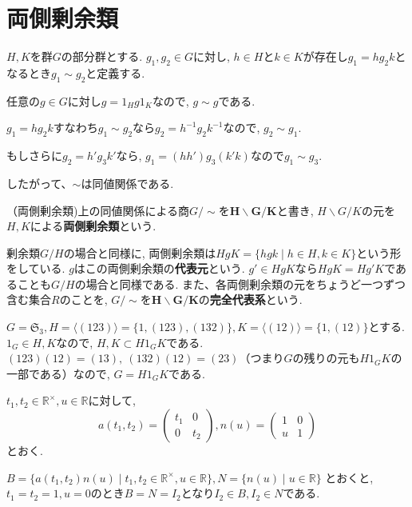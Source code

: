 \section*{両側剰余類}

$H,K$を群$G$の部分群とする. $g_1,g_2 \in G$に対し, 
$h \in H$と$k \in K$が存在し$g_1 = hg_2k$となるとき$g_1\sim g_2$と定義する.

任意の$g\in G$に対し$g=1_Hg1_K$なので, $g\sim g$である.

$g_1=hg_2k$すなわち$g_1\sim g_2$なら$g_2=h^{-1}g_2k^{-1}$なので, $g_2 \sim g_1$.

もしさらに$g_2=h'g_3k'$なら, $g_1 = (hh')g_3(k'k)$なので$g_1\sim g_3$.

したがって、$\sim$は同値関係である.

\begin{dfn*}
  （両側剰余類)\quad 上の同値関係による商$G/\sim$を$\mathbf{H\backslash G/K}$と書き,
  $H\backslash G/K$の元を$H,K$による\textbf{両側剰余類}という.
\end{dfn*}
剰余類$G/H$の場合と同様に, 
両側剰余類は$HgK=\{hgk \mid h \in H, k \in K\}$という形をしている.
$g$はこの両側剰余類の\textbf{代表元}という.
$g'\in HgK$なら$HgK=Hg'K$であることも$G/H$の場合と同様である.
また、各両側剰余類の元をちょうど一つずつ含む集合$R$のことを,
$G/\sim$を$\mathbf{H\backslash G/K}$の\textbf{完全代表系}という.\newline

$G=\mathfrak{S}_3, H=\langle (123) \rangle=\{1, (123),(132)\}, K=\langle (12) \rangle=\{1,(12)\}$とする.
$1_G \in H,K$なので, $H,K \subset H1_GK$である.
$(123)(12)=(13),\:(132)(12)=(23)$（つまり$G$の残りの元も$H1_GK$の一部である）なので, 
$G=H1_GK$である.\newline

$t_1,t_2\in \mathbb{R}^\times, u \in \mathbb{R}$に対して,
\[
a(t_1,t_2)=\begin{pmatrix} t_1 & 0 \\ 0 & t_2 \end{pmatrix},
n(u)=\begin{pmatrix}1 & 0 \\ u & 1 \end{pmatrix}
\]
とおく.

$B=\{a(t_1,t_2)n(u) \mid t_1,t_2 \in \mathbb{R}^\times, u \in \mathbb{R}\},
N=\{n(u) \mid u \in \mathbb{R}\}$ とおくと, 
$t_1=t_2=1, u=0$のとき$B=N=I_2$となり$I_2 \in B, I_2\in N$である.

